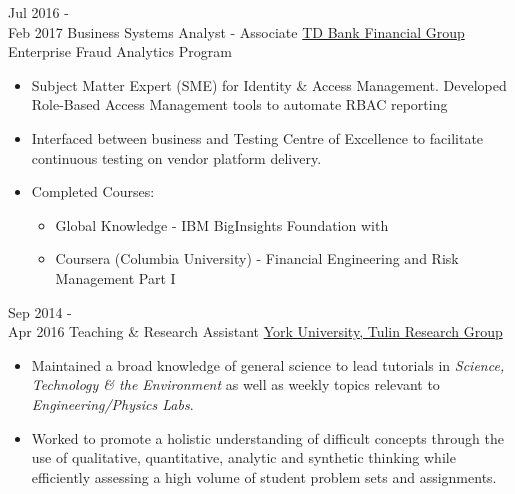 \documentclass[letterpaper]{twentysecondcv} %
\begin{document}
\begin{twenty} %
    \twentyitem
   		{Jul 2016 - \\
   		Feb 2017}
        {Business Systems Analyst - Associate}
        {\href{http://www.td.com/}{TD Bank Financial Group}}
        {Enterprise Fraud Analytics Program}
        {
        {\begin{itemize}
        \item Subject Matter Expert (SME) for Identity \& Access Management. Developed Role-Based Access Management tools to automate RBAC reporting 
        \item Interfaced between business and Testing Centre of Excellence to facilitate continuous testing on vendor platform delivery.
        \item Completed Courses: 
        	\begin{itemize}
        	\item Global Knowledge - IBM BigInsights Foundation with 
    	    \item Coursera (Columbia University) - Financial Engineering and Risk Management Part I
	        \end{itemize}
    \end{itemize}}
        }        

     \twentyitem
   		{Sep 2014 - \\ Apr 2016}
        {Teaching \& Research Assistant}
        {\href{http://www.yorku.ca/}{York University, Tulin Research Group}}
        {}
        {
        \begin{itemize}
        \item Maintained a broad knowledge of general science to lead tutorials in \emph{Science, Technology \& the Environment} as well as  weekly topics relevant to \emph{Engineering/Physics Labs}.
        \item Worked to promote a holistic understanding of difficult concepts through the use of qualitative, quantitative, analytic and synthetic thinking while efficiently assessing a high volume of student problem sets and assignments.
	    \end{itemize}
    	}



\end{twenty}
\end{document}
